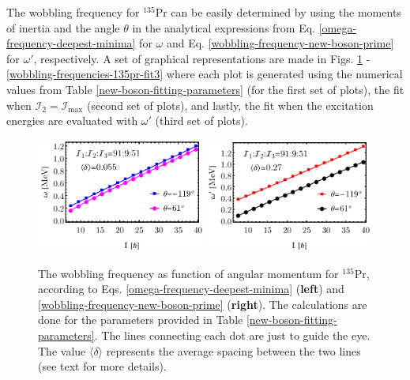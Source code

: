 The wobbling frequency for $^{135}$Pr can be easily determined by using the moments of inertia and the angle $\theta$ in the analytical expressions from Eq. \ref{omega-frequency-deepest-minima} for $\omega$ and Eq. \ref{wobbling-frequency-new-boson-prime} for $\omega'$, respectively. A set of graphical representations are made in Figs. \ref{wobbling-frequencies-135pr-fit1} - \ref{wobbling-frequencies-135pr-fit3} where each plot is generated using the numerical values from Table \ref{new-boson-fitting-parameters} (for the first set of plots), the fit when $\mathcal{I}_2=\mathcal{I}_\text{max}$ (second set of plots), and lastly, the fit when the excitation energies are evaluated with $\omega'$ (third set of plots).
\begin{figure}
    \centering
    \includegraphics[width=0.49\textwidth]{Chapters/Figures/omega-fit-1.pdf}
    \includegraphics[width=0.49\textwidth]{Chapters/Figures/omega-prime-fit-1.pdf}
    \caption{The wobbling frequency as function of angular momentum for $^{135}$Pr, according to Eqs. \ref{omega-frequency-deepest-minima} (\textbf{left}) and \ref{wobbling-frequency-new-boson-prime} (\textbf{right}). The calculations are done for the parameters provided in Table \ref{new-boson-fitting-parameters}. The lines connecting each dot are just to guide the eye. The value $\langle\delta\rangle$ represents the average spacing between the two lines (see text for more details).}
    \label{wobbling-frequencies-135pr-fit1}
\end{figure}
